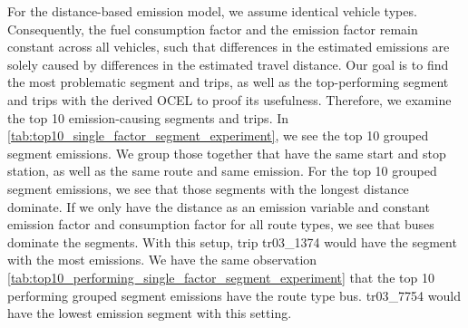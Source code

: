 For the distance-based emission model, we assume identical vehicle types. Consequently, the fuel consumption factor and the emission factor remain constant across all vehicles, such that differences in the estimated emissions are solely caused by differences in the estimated travel distance.
Our goal is to find the most problematic segment and trips, as well as the top-performing segment and trips with the derived OCEL to proof its usefulness. Therefore, we examine the top 10 emission-causing segments and trips. In \autoref{tab:top10_single_factor_segment_experiment}, we see the top 10 grouped segment emissions. We group those together that have the same start and stop station, as well as the same route and same emission. For the top 10 grouped segment emissions, we see that those segments with the longest distance dominate. If we only have the distance as an emission variable and constant emission factor and consumption factor for all route types, we see that buses dominate the segments. With this setup, trip tr03\_1374 would have the segment with the most emissions. We have the same observation \autoref{tab:top10_performing_single_factor_segment_experiment} that the top 10 performing grouped segment emissions have the route type bus. tr03\_7754 would have the lowest emission segment with this setting. 
